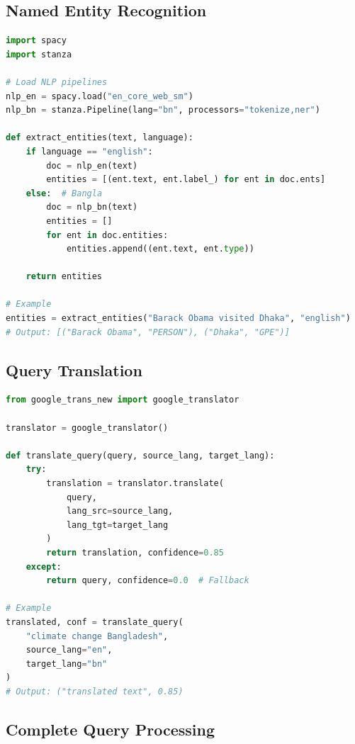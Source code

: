 \documentclass[12pt,a4paper]{report}
\begin{document}
\subsection{Named Entity Recognition}

\begin{lstlisting}[language=Python, caption=Entity Extraction]
import spacy
import stanza

# Load NLP pipelines
nlp_en = spacy.load("en_core_web_sm")
nlp_bn = stanza.Pipeline(lang="bn", processors="tokenize,ner")

def extract_entities(text, language):
    if language == "english":
        doc = nlp_en(text)
        entities = [(ent.text, ent.label_) for ent in doc.ents]
    else:  # Bangla
        doc = nlp_bn(text)
        entities = []
        for ent in doc.entities:
            entities.append((ent.text, ent.type))
    
    return entities

# Example
entities = extract_entities("Barack Obama visited Dhaka", "english")
# Output: [("Barack Obama", "PERSON"), ("Dhaka", "GPE")]
\end{lstlisting}

\subsection{Query Translation}

\begin{lstlisting}[language=Python, caption=Cross-Lingual Translation]
from google_trans_new import google_translator

translator = google_translator()

def translate_query(query, source_lang, target_lang):
    try:
        translation = translator.translate(
            query, 
            lang_src=source_lang,
            lang_tgt=target_lang
        )
        return translation, confidence=0.85
    except:
        return query, confidence=0.0  # Fallback

# Example
translated, conf = translate_query(
    "climate change Bangladesh",
    source_lang="en",
    target_lang="bn"
)
# Output: ("translated text", 0.85)
\end{lstlisting}

\subsection{Complete Query Processing}
\end{document}
